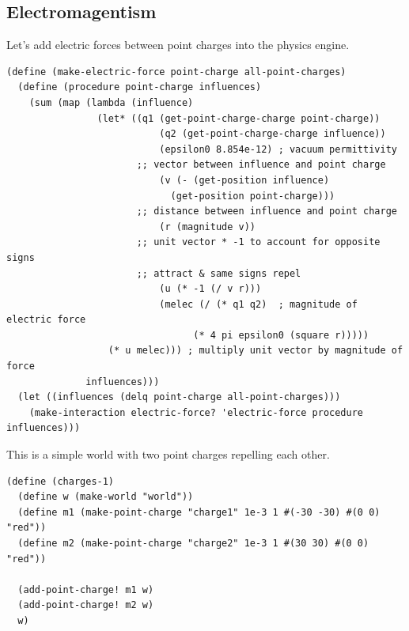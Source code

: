 \documentclass{article}
\begin{document}
\subsection{Electromagentism}

Let's add electric forces between point charges into the physics engine.

{\small\begin{verbatim}
(define (make-electric-force point-charge all-point-charges)
  (define (procedure point-charge influences)
    (sum (map (lambda (influence)
                (let* ((q1 (get-point-charge-charge point-charge))
            		       (q2 (get-point-charge-charge influence))
            		       (epsilon0 8.854e-12) ; vacuum permittivity
                       ;; vector between influence and point charge
            		       (v (- (get-position influence)
                             (get-position point-charge)))
                       ;; distance between influence and point charge
            		       (r (magnitude v))
                       ;; unit vector * -1 to account for opposite signs
                       ;; attract & same signs repel
            		       (u (* -1 (/ v r)))
            		       (melec (/ (* q1 q2)  ; magnitude of electric force
                                 (* 4 pi epsilon0 (square r)))))
                  (* u melec))) ; multiply unit vector by magnitude of force
              influences)))
  (let ((influences (delq point-charge all-point-charges)))
    (make-interaction electric-force? 'electric-force procedure influences)))
\end{verbatim}}


This is a simple world with two point charges repelling each other.

{\small\begin{verbatim}
(define (charges-1)
  (define w (make-world "world"))
  (define m1 (make-point-charge "charge1" 1e-3 1 #(-30 -30) #(0 0) "red"))
  (define m2 (make-point-charge "charge2" 1e-3 1 #(30 30) #(0 0) "red"))

  (add-point-charge! m1 w)
  (add-point-charge! m2 w)
  w)
\end{verbatim}}

\end{document}
